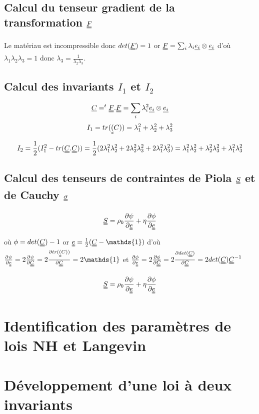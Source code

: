 \documentclass[a4paper,11pt]{article}
\begin{document}
\subsection{Calcul du tenseur gradient de la transformation $\uuline{F}$}
Le matériau est incompressible donc $det(\uuline{F})=1$ or $\uuline{F}=\sum_{i} \lambda_i \uline{e_i}\otimes \uline{e_i}$ d'où $\lambda_1\lambda_2\lambda_3=1$ donc $\lambda_3=\frac{1}{\lambda_2\lambda_3} $.

\subsection{Calcul des invariants $I_1$ et $I_2$}
$$\uline{C}=^t\uuline{F}.\uuline{F}=\sum_{i} \lambda_i ^2\uline{e_i}\otimes \uline{e_i}$$
$$I_1= tr(\uuline(C))=\lambda_1^2+\lambda_2^2+\lambda_3^2$$
$$I_2=\frac{1}{2}(I_1^2 - tr(\uuline{C}.\uuline{C})) =\frac{1}{2}(2\lambda_1^2\lambda_2^2+2\lambda_2^2\lambda_3^2+2\lambda_1^2\lambda_3^2) =\lambda_1^2\lambda_2^2+\lambda_2^2\lambda_3^2+\lambda_1^2\lambda_3^2  $$

\subsection{Calcul des tenseurs de contraintes de Piola $\uuline{S}$ et de Cauchy $\uuline{\sigma}$}
$$ \uuline{S} = \rho_0 \frac{\partial \psi}{\partial \uuline{e}} + \eta\frac{\partial \phi}{\partial \uuline{e}} $$ où $\phi= det(\uuline{C})-1 $
or $\uuline{e}=\frac{1}{2}(\uuline{C}-\mathds{1})$ d'où $\frac{\partial \psi}{\partial \uuline{e}} =2 \frac{\partial \psi}{\partial \uuline{C}} = 2 \frac{\partial tr(\uuline(C))}{\partial \uuline{C}} = 2 \mathds{1}$
et $\frac{\partial \phi}{\partial \uuline{e}} = 2 \frac{\partial \phi}{\partial \uuline{C}}= 2 \frac{\partial det(\uuline{C})}{\partial \uuline{C}}= 2 det(\uuline{C}) \uuline{C}^{-1}$

$$\uuline{S} = \rho_0 \frac{\partial \psi}{\partial \uuline{e}} + \eta\frac{\partial \phi}{\partial \uuline{e}} $$


\section{Identification des paramètres de lois NH et Langevin}



\section{Développement d'une loi à deux invariants}
\end{document}
